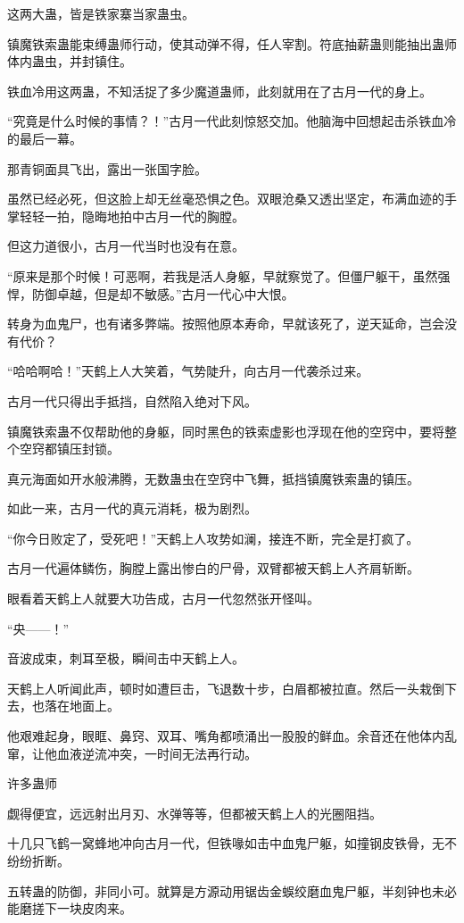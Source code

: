 \begin{this_body}
这两大蛊，皆是铁家寨当家蛊虫。

镇魔铁索蛊能束缚蛊师行动，使其动弹不得，任人宰割。符底抽薪蛊则能抽出蛊师体内蛊虫，并封镇住。

铁血冷用这两蛊，不知活捉了多少魔道蛊师，此刻就用在了古月一代的身上。

“究竟是什么时候的事情？！”古月一代此刻惊怒交加。他脑海中回想起击杀铁血冷的最后一幕。

那青铜面具飞出，露出一张国字脸。

虽然已经必死，但这脸上却无丝毫恐惧之色。双眼沧桑又透出坚定，布满血迹的手掌轻轻一拍，隐晦地拍中古月一代的胸膛。

但这力道很小，古月一代当时也没有在意。

“原来是那个时候！可恶啊，若我是活人身躯，早就察觉了。但僵尸躯干，虽然强悍，防御卓越，但是却不敏感。”古月一代心中大恨。

转身为血鬼尸，也有诸多弊端。按照他原本寿命，早就该死了，逆天延命，岂会没有代价？

“哈哈啊哈！”天鹤上人大笑着，气势陡升，向古月一代袭杀过来。

古月一代只得出手抵挡，自然陷入绝对下风。

镇魔铁索蛊不仅帮助他的身躯，同时黑色的铁索虚影也浮现在他的空窍中，要将整个空窍都镇压封锁。

真元海面如开水般沸腾，无数蛊虫在空窍中飞舞，抵挡镇魔铁索蛊的镇压。

如此一来，古月一代的真元消耗，极为剧烈。

“你今日败定了，受死吧！”天鹤上人攻势如澜，接连不断，完全是打疯了。

古月一代遍体鳞伤，胸膛上露出惨白的尸骨，双臂都被天鹤上人齐肩斩断。

眼看着天鹤上人就要大功告成，古月一代忽然张开怪叫。

“央——！”

音波成束，刺耳至极，瞬间击中天鹤上人。

天鹤上人听闻此声，顿时如遭巨击，飞退数十步，白眉都被拉直。然后一头栽倒下去，也落在地面上。

他艰难起身，眼眶、鼻窍、双耳、嘴角都喷涌出一股股的鲜血。余音还在他体内乱窜，让他血液逆流冲突，一时间无法再行动。

许多蛊师

觑得便宜，远远射出月刃、水弹等等，但都被天鹤上人的光圈阻挡。

十几只飞鹤一窝蜂地冲向古月一代，但铁喙如击中血鬼尸躯，如撞钢皮铁骨，无不纷纷折断。

五转蛊的防御，非同小可。就算是方源动用锯齿金蜈绞磨血鬼尸躯，半刻钟也未必能磨搓下一块皮肉来。


\end{this_body}
